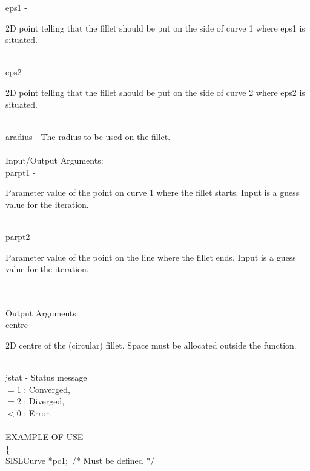         \>\>    {\fov eps1}    \> - \>
        \begin{minipg2}
          2D point telling that the fillet should be put on
          the side of curve 1 where {\fov eps1} is situated.
        \end{minipg2}\\[0.8ex]
        \>\>    {\fov eps2}    \> - \>
        \begin{minipg2}
          2D point telling that the fillet should be put on the
          side of curve 2 where {\fov eps2} is situated.
        \end{minipg2}\\[0.8ex]
        \>\>    {\fov aradius} \> - \> The radius to be used on the fillet.\\
\\
        \>Input/Output Arguments:\\
        \>\>    {\fov parpt1}  \> - \>
        \begin{minipg2}
          Parameter value of the point on curve 1 where the
          fillet starts. Input is a guess value for the iteration.
        \end{minipg2}\\[0.8ex]
        \>\>    {\fov parpt2}  \> - \>
        \begin{minipg2}
          Parameter value of the point on the line where the
          fillet ends. Input is a guess value for the iteration.
        \end{minipg2}\\[0.8ex]
\\
        \>Output Arguments:\\
        \>\>    {\fov centre}  \> - \>
        \begin{minipg2}
          2D centre of the (circular) fillet.  Space must be
          allocated outside the function.
        \end{minipg2}\\[0.8ex]
\newpagetabs
        \>\>    {\fov jstat} \> - \> Status message\\
                \>\>\>\>\> $= 1$      : Converged,\\
                \>\>\>\>\> $= 2$      : Diverged,\\
                \>\>\>\>\> $< 0$      : Error.\\
\\
EXAMPLE OF USE\\
        \>      \{ \\
        \>\>    SISLCurve \> *{\fov pc1}; \,/* Must be defined */ \\
